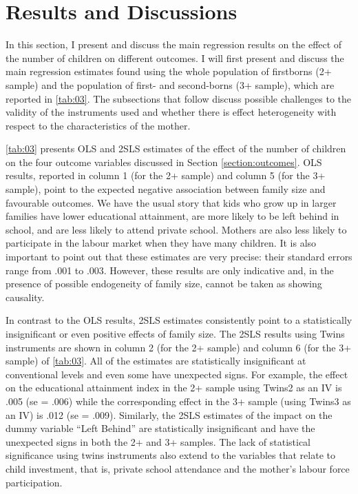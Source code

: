 
\section{Results and Discussions}

In this section, I present and discuss the main regression results on the effect of the number of children on different outcomes. I will first present and discuss the main regression estimates found using the whole population of firstborns (2+ sample) and the population of first- and second-borns (3+ sample), which are reported in \autoref{tab:03}. The subsections that follow discuss possible challenges to the validity of the instruments used and whether there is effect heterogeneity with respect to the characteristics of the mother.

\autoref{tab:03} presents OLS and 2SLS estimates of the effect of the number of children on the four outcome variables discussed in Section \ref{section:outcomes}. OLS results, reported in column 1 (for the 2+ sample) and column 5 (for the 3+ sample), point to the expected negative association between family size and favourable outcomes. We have the usual story that kids who grow up in larger families have lower educational attainment, are more likely to be left behind in school, and are less likely to attend private school. Mothers are also less likely to participate in the labour market when they have many children. It is also important to point out that these estimates are very precise: their standard errors range from .001 to .003. However, these results are only indicative and, in the presence of possible endogeneity of family size, cannot be taken as showing causality.

In contrast to the OLS results, 2SLS estimates consistently point to a statistically insignificant or even positive effects of family size. The 2SLS results using Twins instruments are shown in column 2 (for the 2+ sample) and column 6 (for the 3+ sample) of \autoref{tab:03}. All of the estimates are statistically insignificant at conventional levels and even some have unexpected signs. For example, the effect on the educational attainment index in the 2+ sample using Twins2 as an IV is .005 (se = .006) while the corresponding effect in the 3+ sample (using Twins3 as an IV) is .012 (se = .009). Similarly, the 2SLS estimates of the impact on the dummy variable \enquote{Left Behind} are statistically insignificant and have the unexpected signs in both the 2+ and 3+ samples. The lack of statistical significance using twins instruments also extend to the variables that relate to child investment, that is, private school attendance and the mother's labour force participation. 

